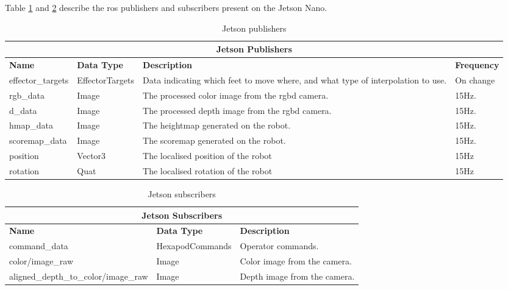     \newpage
    \noindent
    Table \ref{tab:jetson_pubs} and \ref{tab:jetson_subs} describe the \ac{ros} publishers and subscribers present on the Jetson Nano.

    \begin{table}[h]
        \centering
        \begin{tabularx}{\textwidth}{| l | l | X | l |}
            \hline
            \multicolumn{4}{|c|}{\textbf{Jetson Publishers}} \\ \hline
            \textbf{Name} & \textbf{Data Type} & \textbf{Description} & \textbf{Frequency} \\ \hline
            effector\_targets & EffectorTargets & Data indicating which feet to move where, and what type of interpolation to use. & On change\\ \hline
            rgb\_data & Image & The processed color image from the \ac{rgbd} camera. & 15Hz. \\ \hline
            d\_data & Image & The processed depth image from the \ac{rgbd} camera. & 15Hz. \\ \hline
            hmap\_data & Image & The heightmap generated on the robot. & 15Hz. \\ \hline
            scoremap\_data & Image & The scoremap generated on the robot. & 15Hz. \\ \hline
            position & Vector3 & The localised position of the robot & 15Hz \\ \hline
            rotation & Quat & The localised rotation of the robot & 15Hz \\ \hline
        \end{tabularx}
        \caption{Jetson publishers}
        \label{tab:jetson_pubs}
    \end{table}
    \begin{table}[h]
        \centering
        \begin{tabularx}{\textwidth}{| l | l | X |}
            \hline
            \multicolumn{3}{|c|}{\textbf{Jetson Subscribers}} \\ \hline
            \textbf{Name}  & \textbf{Data Type} & \textbf{Description} \\ \hline
            command\_data & HexapodCommands & Operator commands. \\ \hline
            color/image\_raw & Image & Color image from the camera. \\ \hline
            aligned\_depth\_to\_color/image\_raw & Image & Depth image from the camera. \\ \hline
        \end{tabularx}
        \caption{Jetson subscribers}
        \label{tab:jetson_subs}
    \end{table}

